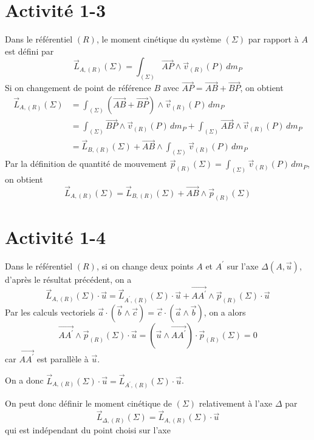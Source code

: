 \documentclass[a4paper,12pt]{book}
\begin{document}
\renewcommand{\labelitemi}{$\blacktriangleright$}
\renewcommand{\labelitemii}{$\bullet$}


\section{Activité 1-3}
Dans le référentiel $(R)$, le moment cinétique du système $(\Sigma)$ par rapport à $A$ est défini par 
$$
\overrightarrow{L}_{A,(R)}(\Sigma)=\int_{(\Sigma)}\overrightarrow{AP} \wedge \vec{v}_{(R)}(P)\,dm_P
$$
Si on changement de point de référence $B$ avec $\overrightarrow{AP}=\overrightarrow{AB}+\overrightarrow{BP}$, on obtient 
\begin{align*}
\overrightarrow{L}_{A,(R)}(\Sigma)&=\int_{(\Sigma)}(\overrightarrow{AB}+\overrightarrow{BP}) \wedge \vec{v}_{(R)}(P)\,dm_P\\
&=\int_{(\Sigma)}\overrightarrow{BP} \wedge \vec{v}_{(R)}(P)\,dm_P+\int_{(\Sigma)}\overrightarrow{AB} \wedge \vec{v}_{(R)}(P)\,dm_P\\
&=\overrightarrow{L}_{B,(R)}(\Sigma)+\overrightarrow{AB}\wedge\int_{(\Sigma)}\vec{v}_{(R)}(P)\,dm_P
\end{align*}
Par la définition de quantité de mouvement $\vec{p}_{(R)}(\Sigma)=\int_{(\Sigma)}\vec{v}_{(R)}(P)\,dm_P$, 
on obtient 
$$\boxed{\overrightarrow{L}_{A,(R)}(\Sigma)=\overrightarrow{L}_{B,(R)}(\Sigma)+\overrightarrow{AB}\wedge\vec{p}_{(R)}(\Sigma)} $$

\section{Activité 1-4}
Dans le référentiel $(R)$, si on change deux points $A$ et $A^{'}$ sur l'axe $\Delta(A,\vec{u})$, d'après le résultat précédent, on a 
$$
\overrightarrow{L}_{A,(R)}(\Sigma)\cdot \vec{u}=\overrightarrow{L}_{A^{'},(R)}(\Sigma)\cdot \vec{u}+\overrightarrow{AA^{'}}\wedge \vec{p}_{(R)}(\Sigma)\cdot\vec{u}
$$
Par les calculs vectoriels $\vec{a}\cdot(\vec{b}\wedge\vec{c})=\vec{c}\cdot(\vec{a}\wedge\vec{b})$, on a alors 
$$
\overrightarrow{AA^{'}}\wedge \vec{p}_{(R)}(\Sigma)\cdot\vec{u}=(\vec{u}\wedge\overrightarrow{AA^{'}})\cdot\vec{p}_{(R)}(\Sigma)=0
$$
car $\overrightarrow{AA^{'}}$ est parallèle à $\vec{u}$. 

On a donc $\boxed{\overrightarrow{L}_{A,(R)}(\Sigma)\cdot \vec{u}=\overrightarrow{L}_{A^{'},(R)}(\Sigma)\cdot \vec{u}}$. 

On peut donc définir le moment cinétique de $(\Sigma)$ relativement à l'axe $\Delta$ par 
$$
\overrightarrow{L}_{\Delta,(R)}(\Sigma)=\overrightarrow{L}_{A,(R)}(\Sigma)\cdot \vec{u}
$$
qui est indépendant du point choisi sur l'axe
\end{document}
